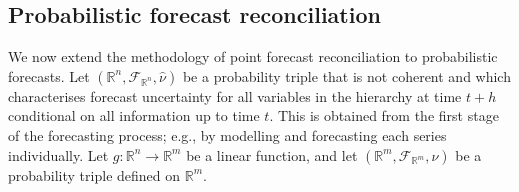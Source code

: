 \documentclass[12pt]{article}
\newtheorem{theo}{Theorem}[section]
\theoremstyle{definition}
\begin{document}
%
%

\subsection{Probabilistic forecast reconciliation} \label{subsec:ProbForecastRecon}

We now extend the methodology of point forecast reconciliation to probabilistic forecasts.
Let $(\mathbb{R}^n, \mathscr{F}_{\mathbb{R}^n}, \hat{\nu})$ be a probability triple that is not coherent and which characterises forecast uncertainty for all variables in the hierarchy at time $t+h$ conditional on all information up to time $t$. This is obtained from the first stage of the forecasting process; e.g., by modelling and forecasting each series individually. Let $g:\mathbb{R}^n \rightarrow \mathbb{R}^m $ be a linear function, and let $(\mathbb{R}^m, \mathscr{F}_{\mathbb{R}^m}, \nu)$ be a probability triple defined on $\mathbb{R}^m$.
\end{document}
